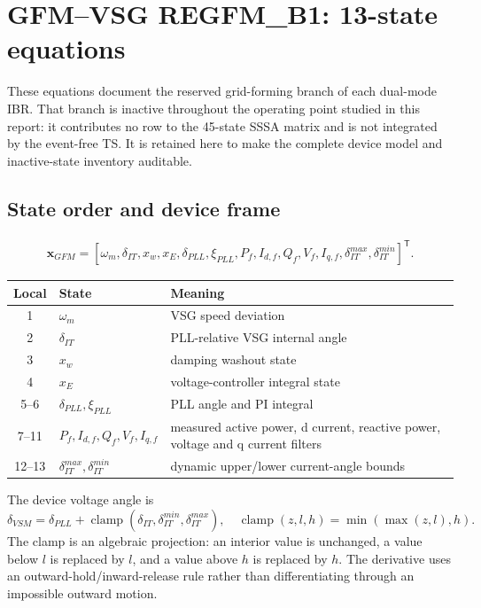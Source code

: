 \documentclass[12pt,a4paper]{article}
\newcommand{\clamp}{\operatorname{clamp}}
\newcommand{\vect}[1]{\boldsymbol{#1}}
\begin{document}
\section{GFM--VSG REGFM\_B1: 13-state equations}

These equations document the reserved grid-forming branch of each dual-mode
IBR.  That branch is inactive throughout the operating point studied in this
report: it contributes no row to the 45-state SSSA matrix and is not integrated
by the event-free TS.  It is retained here to make the complete device model
and inactive-state inventory auditable.

\subsection{State order and device frame}

\begin{multline}
\vect x_{GFM}=[\omega_m,\delta_{IT},x_w,x_E,\delta_{PLL},\xi_{PLL},
P_f,I_{d,f},Q_f,V_f,I_{q,f},\delta_{IT}^{max},\delta_{IT}^{min}]^{\mathsf T}.
\end{multline}
\begin{center}\scriptsize
\begin{tabularx}{\textwidth}{c l X}
\toprule
Local & State & Meaning\\\midrule
1 & \(\omega_m\) & VSG speed deviation\\
2 & \(\delta_{IT}\) & PLL-relative VSG internal angle\\
3 & \(x_w\) & damping washout state\\
4 & \(x_E\) & voltage-controller integral state\\
5--6 & \(\delta_{PLL},\xi_{PLL}\) & PLL angle and PI integral\\
7--11 & \(P_f,I_{d,f},Q_f,V_f,I_{q,f}\) & measured active power, d current, reactive power, voltage and q current filters\\
12--13 & \(\delta_{IT}^{max},\delta_{IT}^{min}\) & dynamic upper/lower current-angle bounds\\
\bottomrule
\end{tabularx}
\end{center}
The device voltage angle is
\[
\delta_{VSM}=\delta_{PLL}+\clamp(\delta_{IT},\delta_{IT}^{min},\delta_{IT}^{max}),
\quad
\clamp(z,l,h)=\min(\max(z,l),h).
\]
The clamp is an algebraic projection: an interior value is unchanged, a value
below \(l\) is replaced by \(l\), and a value above \(h\) is replaced by \(h\).
The derivative uses an outward-hold/inward-release rule rather than
differentiating through an impossible outward motion.
\end{document}
